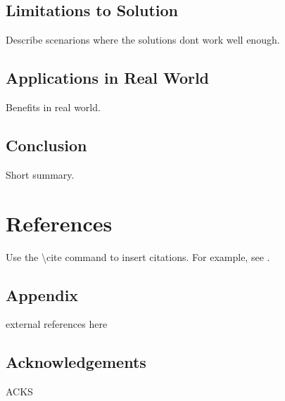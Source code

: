 \documentclass{article}
\begin{document}
\subsection{Limitations to Solution}
Describe scenarions where the solutions dont work well enough.

\subsection{Applications in Real World}
Benefits in real world.

\subsection{Conclusion}
Short summary.

\section{References}
Use the \textbackslash cite command to insert citations. For example, see \cite{reference1}.

\subsection{Appendix}
external references here

\subsection{Acknowledgements}
ACKS



\end{document}
